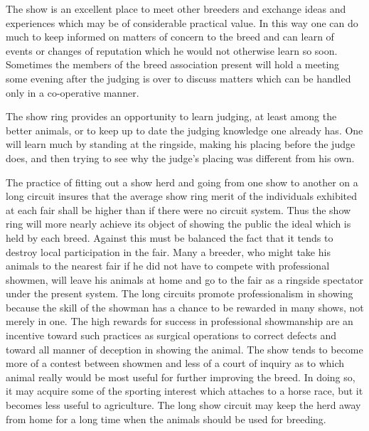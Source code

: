 The show is an excellent place to meet other breeders and exchange
ideas and experiences which may be of considerable practical value. In
this way one can do much to keep informed on matters of concern to
the breed and can learn of events or changes of reputation which he
would not otherwise learn so soon. Sometimes the members of the
breed association present will hold a meeting some evening after the
judging is over to discuss matters which can be handled only in a co-operative
manner.

The show ring provides an opportunity to learn judging, at least
among the better animals, or to keep up to date the judging knowledge
one already has. One will learn much by standing at the ringside, making
his placing before the judge does, and then trying to see why the
judge's placing was different from his own.

The practice of fitting out a show herd and going from one show to
another on a long circuit insures that the average show ring merit of the
individuals exhibited at each fair shall be higher than if there were no
circuit system. Thus the show ring will more nearly achieve its object of
showing the public the ideal which is held by each breed. Against this
must be balanced the fact that it tends to destroy local participation in
the fair. Many a breeder, who might take his animals to the nearest fair
if he did not have to compete with professional showmen, will leave his
animals at home and go to the fair as a ringside spectator under the
present system. The long circuits promote professionalism in showing
because the skill of the showman has a chance to be rewarded in many
shows, not merely in one. The high rewards for success in professional
showmanship are an incentive toward such practices as surgical operations
to correct defects and toward all manner of deception in showing
the animal. The show tends to become more of a contest between showmen
and less of a court of inquiry as to which animal really would
be most useful for further improving the breed. In doing so, it may
acquire some of the sporting interest which attaches to a horse race, but
it becomes less useful to agriculture. The long show circuit may keep
the herd away from home for a long time when the animals should be
used for breeding.

